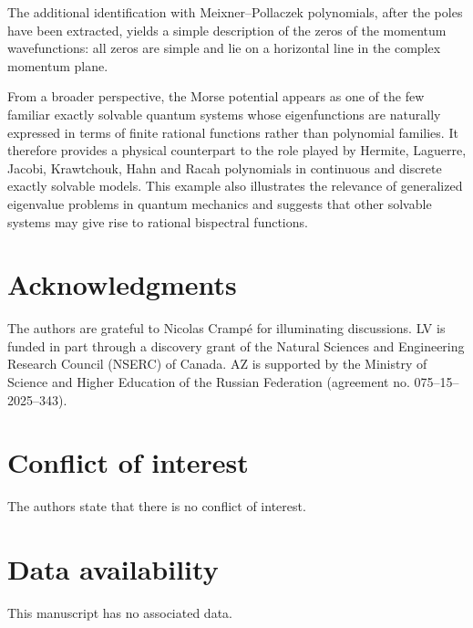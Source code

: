 \documentclass[11pt,reqno]{amsart}
\numberwithin{equation}{section}
\begin{document}
The additional identification with Meixner--Pollaczek polynomials, after the poles have been
extracted, yields a simple description of the zeros of the momentum wavefunctions: all zeros are
simple and lie on a horizontal line in the complex momentum plane.

From a broader perspective, the Morse potential appears as one of the few familiar exactly
solvable quantum systems whose eigenfunctions are naturally expressed in terms of finite rational
functions rather than polynomial families.  It therefore provides a physical counterpart to the
role played by Hermite, Laguerre, Jacobi, Krawtchouk, Hahn and Racah polynomials in continuous
and discrete exactly solvable models.  This example also illustrates the relevance of generalized
eigenvalue problems in quantum mechanics and suggests that other solvable systems may give rise
to rational bispectral functions.

\section*{Acknowledgments}
The authors are grateful to Nicolas Crampé for illuminating discussions. LV is funded in part through a discovery grant of the Natural Sciences and Engineering Research Council (NSERC) of Canada. 
 AZ is supported by the Ministry of Science and Higher Education of the Russian Federation (agreement no. 075–15–2025–343).

\section*{Conflict of interest}
The authors state that there is no conflict of interest.

\section*{Data availability}
This manuscript has no associated data.

\bigskip
\end{document}
